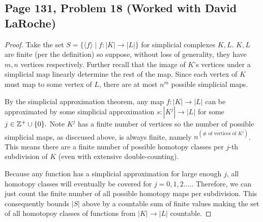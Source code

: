\subsection*{Page 131, Problem 18 (Worked with David LaRoche)}
\vspace{15pt}
\begin{proof}
    \vspace{-10pt}
    Take the set $S = \{\langle f\rangle \mid f\colon |K| \to |L|\}$ for simplicial complexes $K, L$. $K, L$ are finite (per the definition) so suppose, without loss of generality, they have $m,n$ vertices respectively. Further recall that the image of $K$'s vertices under a simplicial map linearly determine the rest of the map. Since each vertex of $K$ must map to some vertex of $L$, there are at most $n^m$ possible simplicial maps.

    By the simplicial approximation theorem, any map $f\colon |K| \to |L|$ can be approximated by some simplicial approximation $s \colon |K^j| \to |L|$ for some $j \in \mathbb{Z}^+\cup\{0\}.$ Note $K^j$ has a finite number of vertices so the number of possible simplicial maps, as disccused above, is always finite, namely $n^{(\#\text{ of vertices of $K^j$})}$. This means there are a finite number of possible homotopy classes per $j$-th subdivision of $K$ (even with extensive double-counting). 
    
    Because any function has a simplicial approximation for large enough $j$, all homotopy classes will eventually be covered for $j = 0,1,2\ldots.$. Therefore, we can just count the finite number of all possible homotopy maps per subdivision. This consequently bounds $|S|$ above by a countable sum of finite values making the set of all homotopoy classes of functions from $|K| \to |L|$ countable.
\end{proof}